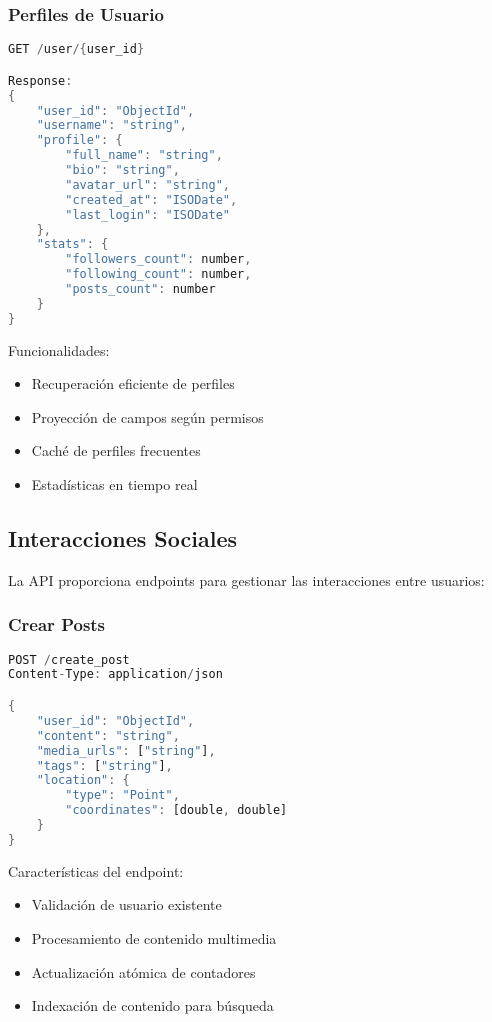 \documentclass[12pt,letterpaper]{article}
\begin{document}
\subsubsection{Perfiles de Usuario}
\begin{lstlisting}[language=rust]
GET /user/{user_id}

Response:
{
    "user_id": "ObjectId",
    "username": "string",
    "profile": {
        "full_name": "string",
        "bio": "string",
        "avatar_url": "string",
        "created_at": "ISODate",
        "last_login": "ISODate"
    },
    "stats": {
        "followers_count": number,
        "following_count": number,
        "posts_count": number
    }
}
\end{lstlisting}

Funcionalidades:
\begin{itemize}
    \item Recuperación eficiente de perfiles
    \item Proyección de campos según permisos
    \item Caché de perfiles frecuentes
    \item Estadísticas en tiempo real
\end{itemize}

\subsection{Interacciones Sociales}
La API proporciona endpoints para gestionar las interacciones entre usuarios:

\subsubsection{Crear Posts}
\begin{lstlisting}[language=rust]
POST /create_post
Content-Type: application/json

{
    "user_id": "ObjectId",
    "content": "string",
    "media_urls": ["string"],
    "tags": ["string"],
    "location": {
        "type": "Point",
        "coordinates": [double, double]
    }
}
\end{lstlisting}

Características del endpoint:
\begin{itemize}
    \item Validación de usuario existente
    \item Procesamiento de contenido multimedia
    \item Actualización atómica de contadores
    \item Indexación de contenido para búsqueda
\end{itemize}
\end{document}
